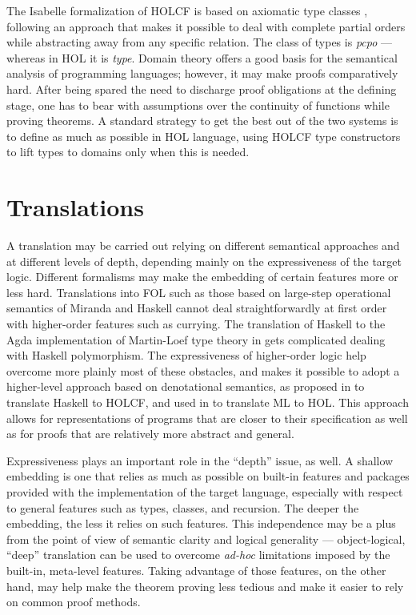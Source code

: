 \documentclass[a4paper,12pt]{article}
\begin{document}
The Isabelle formalization of HOLCF is based on axiomatic type classes
\cite{Wenzel}, following an approach that makes it possible to deal
with complete partial orders while abstracting away from any specific
relation.  The class of types is \emph{pcpo} --- whereas in HOL it is
\emph{type}. Domain theory offers a good basis for the semantical
analysis of programming languages; however, it may make proofs
comparatively hard.  After being spared the need to discharge proof
obligations at the defining stage, one has to bear with assumptions
over the continuity of functions while proving theorems. A standard
strategy to get the best out of the two systems is to define as much
as possible in HOL language, using HOLCF type constructors to lift
types to domains only when this is needed.


\section{Translations}
\label{sec:Translations}

A translation may be carried out relying on different semantical
approaches and at different levels of depth, depending mainly on the
expressiveness of the target logic. Different formalisms may make the
embedding of certain features more or less hard. Translations into FOL
such as those based on large-step operational semantics of Miranda
\cite{Thompson95,Thompson89,Thompson95b} and Haskell \cite{Thompson92}
cannot deal straightforwardly at first order with higher-order
features such as currying.  The translation of Haskell to the Agda
implementation of Martin-Loef type theory in \cite{Abel} gets
complicated dealing with Haskell polymorphism. The expressiveness of
higher-order logic help overcome more plainly most of these obstacles,
and makes it possible to adopt a higher-level approach based on
denotational semantics, as proposed in \cite{Huff} to translate
Haskell to HOLCF, and used in \cite{Pollack} to translate ML to HOL.
This approach allows for representations of programs that are closer
to their specification as well as for proofs that are relatively more
abstract and general.

Expressiveness plays an important role in the ``depth'' issue, as
well.  A shallow embedding is one that relies as much as possible on
built-in features and packages provided with the implementation of the
target language, especially with respect to general features such as
types, classes, and recursion. The deeper the embedding, the less it
relies on such features. This independence may be a plus from the
point of view of semantic clarity and logical generality ---
object-logical, ``deep'' translation can be used to overcome
\emph{ad-hoc} limitations imposed by the built-in, meta-level
features.  Taking advantage of those features, on the other hand, may
help make the theorem proving less tedious and make it easier to rely
on common proof methods.
\end{document}
